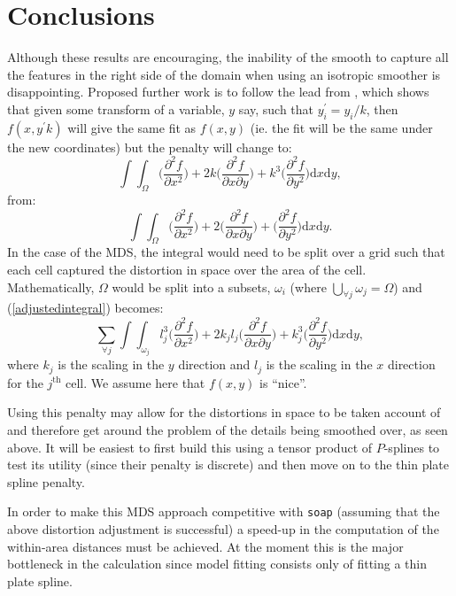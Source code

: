\documentclass[a4paper,10pt]{article}
\begin{document}
\section{Conclusions}

Although these results are encouraging, the inability of the smooth to capture all the features in the right side of the domain when using an isotropic smoother is disappointing. Proposed further work is to follow the lead from \cite{wood2000}, which shows that given some transform of a variable, $y$ say, such that $y_i^\prime=y_i/k$, then $f(x,y^\prime k)$ will give the same fit as $f(x,y)$ (ie. the fit will be the same under the new coordinates) but the penalty will change to:
\begin{equation}
\int\int_\Omega \Big( \frac{\partial^2 f}{\partial x^2} \Big) + 2k\Big( \frac{\partial^2 f}{\partial x \partial y} \Big) + k^3\Big( \frac{\partial^2 f}{\partial y^2} \Big) \text{d}x \text{d}y,
\label{adjustedintegral}
\end{equation}
from:
\begin{equation*}
\int\int_\Omega \Big( \frac{\partial^2 f}{\partial x^2} \Big) + 2\Big( \frac{\partial^2 f}{\partial x \partial y} \Big) + \Big( \frac{\partial^2 f}{\partial y^2} \Big) \text{d}x \text{d}y.
\end{equation*}
In the case of the MDS, the integral would need to be split over a grid such that each cell captured the distortion in space over the area of the cell. Mathematically, $\Omega$ would be split into a subsets, $\omega_i$ (where $\bigcup_{\forall j} \omega_j = \Omega$) and (\ref{adjustedintegral}) becomes:
\begin{equation}
\sum_{\forall j} \int\int_{\omega_j} l_j^3 \Big( \frac{\partial^2 f}{\partial x^2} \Big) + 2k_jl_j\Big( \frac{\partial^2 f}{\partial x \partial y} \Big) + k_j^3\Big( \frac{\partial^2 f}{\partial y^2} \Big) \text{d}x \text{d}y,
\end{equation}
where $k_j$ is the scaling in the $y$ direction and $l_j$ is the scaling in the $x$ direction for the $j^{\text{th}}$ cell. We assume here that $f(x,y)$ is ``nice''.

Using this penalty may allow for the distortions in space to be taken account of and therefore get around the problem of the details being smoothed over, as seen above. It will be easiest to first build this using a tensor product of $P$-splines to test its utility (since their penalty is discrete) and then move on to the thin plate spline penalty.

In order to make this MDS approach competitive with \texttt{soap} (assuming that the above distortion adjustment is successful) a speed-up in the computation of the within-area distances must be achieved. At the moment this is the major bottleneck in the calculation since model fitting consists only of fitting a thin plate spline. 
\end{document}
